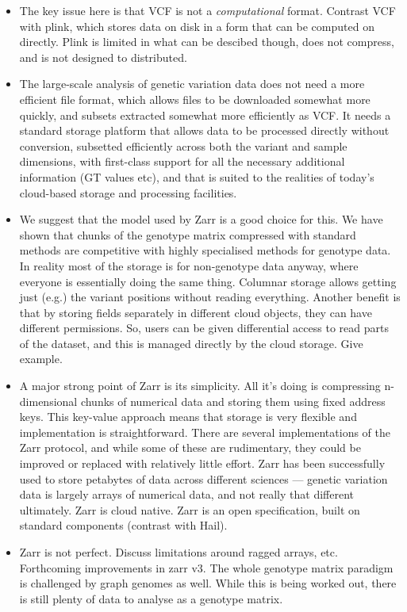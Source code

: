 \documentclass[a4paper,num-refs]{oup-contemporary}
\begin{document}
\begin{itemize}
\item The key issue here is that VCF is not a \emph{computational}
format. Contrast VCF with plink, which stores data on disk in a
form that can be computed on directly. Plink is limited in what
can be descibed though, does not compress, and is not designed
to distributed.

\item The large-scale analysis of genetic variation data does not
need a more efficient file format, which allows files to be downloaded
somewhat more quickly, and subsets extracted somewhat more efficiently
as VCF. It needs a standard storage platform that allows data to be
processed directly without conversion, subsetted efficiently across
both the variant and sample dimensions, with first-class support
for all the necessary additional information (GT values etc),
and that is suited to the realities of today's cloud-based
storage and processing facilities.

\item We suggest that the model used by Zarr is a good choice for this.
We have shown that chunks of the genotype matrix compressed with standard
methods are competitive with highly specialised methods for
genotype data. In reality most of the storage is for non-genotype
data anyway, where everyone is essentially doing the same thing.
Columnar storage allows getting just (e.g.) the variant positions
without reading everything. Another benefit is that by storing
fields separately in different cloud objects, they can have
different permissions. So, users can be given differential access
to read parts of the dataset, and this is managed directly
by the cloud storage. Give example.

\item A major strong point of Zarr is its simplicity. All it's doing
is compressing n-dimensional chunks of numerical data and storing
them using fixed address keys. This key-value approach means that storage
is very flexible and implementation is straightforward. There
are several implementations of the Zarr protocol, and while some of these
are rudimentary, they could be improved or replaced with relatively
little effort. Zarr has been successfully used to store petabytes
of data across different sciences --- genetic variation data is largely
arrays of numerical data, and not really that different ultimately.
Zarr is cloud native.
Zarr is an open specification, built on standard components (contrast
with Hail).

\item Zarr is not perfect. Discuss limitations around ragged arrays,
etc. Forthcoming improvements in zarr v3. The whole genotype matrix
paradigm is challenged by graph genomes as well. While this is
being worked out, there is still plenty of data to analyse as a
genotype matrix.


\end{itemize}
\end{document}
